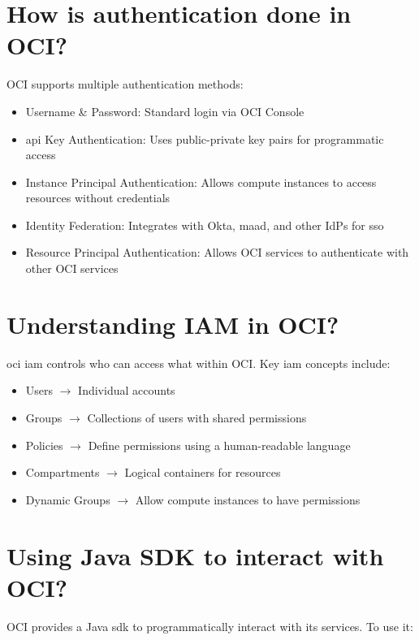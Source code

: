 \documentclass[../main.tex]{subfiles}
\begin{document}
\section{How is authentication done in OCI?}
OCI supports multiple authentication methods:
\begin{itemize}
  \item{Username \& Password: Standard login via OCI Console}
  \item{\acrfull{api} Key Authentication: Uses public-private key pairs for programmatic access}
  \item{Instance Principal Authentication: Allows compute instances to access resources without credentials}
  \item{Identity Federation: Integrates with Okta, \acrfull{maad}, and other \acrfull{IdP}s for \acrfull{sso}}
  \item{Resource Principal Authentication: Allows OCI services to authenticate with other OCI services}
\end{itemize}

\section{Understanding IAM in OCI?}
\acrshort{oci} \acrfull{iam} controls who can access what within OCI. Key \acrshort{iam} concepts include:
\begin{itemize}
  \item Users $\rightarrow$ Individual accounts
  \item Groups $\rightarrow$ Collections of users with shared permissions
  \item Policies $\rightarrow$ Define permissions using a human-readable language
  \item Compartments $\rightarrow$ Logical containers for resources
  \item Dynamic Groups $\rightarrow$ Allow compute instances to have permissions
\end{itemize}

\section{Using Java SDK to interact with OCI?}
OCI provides a Java \acrshort{sdk} to programmatically interact with its services. To use it:
\end{document}
